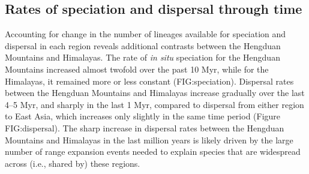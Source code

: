 \subsection{Rates of speciation and dispersal through time}

Accounting for change in the number of lineages available for speciation and dispersal in each region reveals additional contrasts between the Hengduan Mountains and Himalayas. The rate of \textit{in situ} speciation for the Hengduan Mountains increased almost twofold over the past 10 Myr, while for the Himalayas, it remained more or less constant (FIG:speciation). Dispersal rates between the Hengduan Mountains and Himalayas increase gradually over the last 4--5 Myr, and sharply in the last 1 Myr, compared to dispersal from either region to East Asia, which increases only slightly in the same time period (Figure FIG:dispersal). The sharp increase in dispersal rates between the Hengduan Mountains and Himalayas in the last million years is likely driven by the large number of range expansion events needed to explain species that are widespread across (i.e., shared by) these regions.
